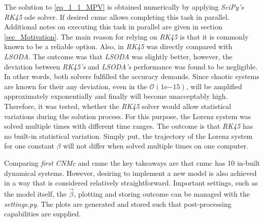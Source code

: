 The solution to \eqref{eq_1_1_MPV} is obtained numerically by applying \emph{SciPy's RK45} \gls{ode} solver. If desired \gls{cnmc} allows completing this task in parallel. Additional notes on executing this task in parallel are given in section \ref{sec_Motivation}. The main reason for relying on \emph{RK45} is that it is commonly known to be a reliable option. 
Also, in \cite{Butt2021} \emph{RK45} was directly compared with \emph{LSODA}. The outcome was that \emph{LSODA} was slightly better, however, the deviation between \emph{RK45's} and \emph{LSODA's} performance was found to be negligible. 
In other words, both solvers fulfilled the accuracy demands. 
Since chaotic systems are known for their  any deviation, even in the  $\mathcal{O} (1 \mathrm{e}{-15})$, will be amplified approximately exponentially and finally will become unacceptably high.
Therefore, it was tested, whether the \emph{RK45} solver would allow statistical variations during the solution process. 
For this purpose, the Lorenz system \cite{lorenz1963deterministic} was solved multiple times with different time ranges. The outcome is that \emph{RK45} has no built-in statistical variation.
Simply put, the trajectory of the Lorenz system for one constant $\beta $ will not differ when solved multiple times on one computer.\newline


Comparing \emph{first CNMc} and \gls{cnmc} the key takeaways are that \gls{cnmc} has 10 in-built dynamical systems. 
However, desiring to implement a new model is also achieved in a way that is considered relatively straightforward. 
Important settings, such as the model itself, the $\vec{\beta }$, plotting and storing outcome can be managed with the \emph{settings.py}. The plots are generated and stored such that post-processing capabilities are supplied.
